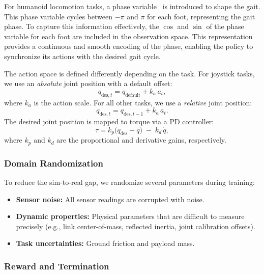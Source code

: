 For humanoid locomotion tasks, a phase variable~\cite{shao2021learning} is introduced to shape the gait. This phase variable cycles between $-\pi$ and $\pi$ for each foot, representing the gait phase. To capture this information effectively, the $\cos$ and $\sin$ of the phase variable for each foot are included in the observation space. This representation provides a continuous and smooth encoding of the phase, enabling the policy to synchronize its actions with the desired gait cycle.

The action space is defined differently depending on the task. 
For joystick tasks, we use an \emph{absolute} joint position with a default offset:
\[
    q_{\text{des}, t} = q_{\text{default}} + k_a \, a_t,
\]
where \(k_a\) is the action scale. 
For all other tasks, we use a \emph{relative} joint position:
\[
    q_{\text{des}, t} = q_{\text{des}, t-1} + k_a \, a_t.
\]
The desired joint position is mapped to torque via a PD controller:
\begin{equation}
    \tau = k_p \bigl(q_{\text{des}} - q\bigr) \;-\; k_d \,\dot{q},
    \label{eq:pd_mapping}
\end{equation}
where \(k_p\) and \(k_d\) are the proportional and derivative gains, respectively.

\subsubsection{Domain Randomization}
To reduce the sim-to-real gap, we randomize several parameters during training:
\begin{itemize}
    \item \textbf{Sensor noise:} All sensor readings are corrupted with noise.
    \item \textbf{Dynamic properties:} Physical parameters that are difficult to measure precisely 
    (e.g., link center-of-mass, reflected inertia, joint calibration offsets).
    \item \textbf{Task uncertainties:} Ground friction and payload mass.
\end{itemize}

\subsubsection{Reward and Termination}

